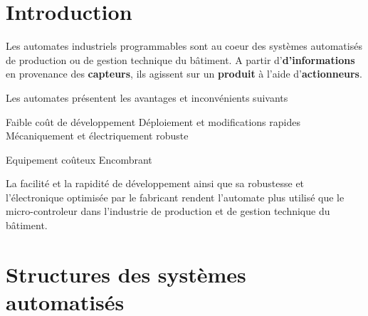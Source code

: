 \documentclass[11pt]{article}
\begin{document}
\UPSTIbuildPage


\section{Introduction}
Les automates industriels programmables sont au coeur des systèmes automatisés de production ou de gestion technique du bâtiment.
A partir d'\textbf{d'informations} en provenance des \textbf{capteurs}, ils agissent sur un \textbf{produit} à l'aide d'\textbf{actionneurs}.

Les automates présentent les avantages et inconvénients suivants

\begin{minipage}[t]{.49\linewidth}
	\begin{itemize}
		\itemc Faible coût de développement
		\itemc Déploiement et modifications rapides
		\itemc Mécaniquement et électriquement robuste
	\end{itemize}
\end{minipage}\hfill
\begin{minipage}[t]{.49\linewidth}
	\begin{itemize}
		\itemx Equipement coûteux
		\itemx Encombrant
	\end{itemize}
\end{minipage}

La facilité et la rapidité de développement ainsi que sa robustesse et l'électronique optimisée par le fabricant rendent l'automate plus utilisé que le micro-controleur dans l'industrie de production et de gestion technique du bâtiment.

\section{Structures des systèmes automatisés}

\end{document}
